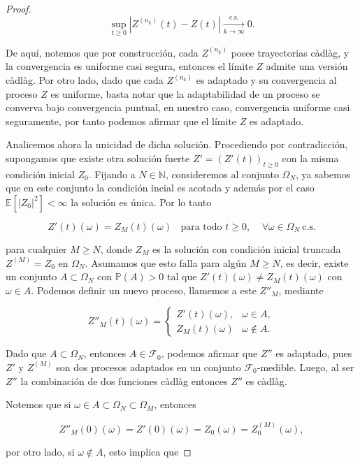 \documentclass[
  spanish,
  us-letterpaper,
]{scrreprt}
\theoremstyle{plain}
\theoremstyle{plain}
\theoremstyle{plain}
\theoremstyle{definition}
\theoremstyle{remark}
\begin{document}
\begin{proof}
\[
    \sup\limits_{t\geq 0}|Z^{(n_k)}(t)-Z(t)| \xrightarrow[k \to \infty]{\text{c.s.}} 0.
\]

De aquí, notemos que por construcción, cada \(Z^{(n_k)}\) posee
trayectorias càdlàg, y la convergencia es uniforme casi segura, entonces
el límite \(Z\) admite una versión càdlàg. Por otro lado, dado que cada
\(Z^{(n_k)}\) es adaptado y su convergencia al proceso \(Z\) es
uniforme, basta notar que la adaptabilidad de un proceso se converva
bajo convergencia puntual, en nuestro caso, convergencia uniforme casi
seguramente, por tanto podemos afirmar que el límite \(Z\) es adaptado.

Analicemos ahora la unicidad de dicha solución. Procediendo por
contradicción, supongamos que existe otra solución fuerte
\(Z'=(Z'(t))_{t\geq 0}\) con la misma condición inicial \(Z_0\). Fijando
a \(N\in \mathbb{N}\), consideremos al conjunto \(\Omega_N\), ya sabemos
que en este conjunto la condición incial es acotada y además por el caso
\(\mathbb{E}[|Z_0|^2]<\infty\) la solución es única. Por lo tanto

\[
    Z'(t)(\omega) = Z_M(t)(\omega)\ \ \ \  \text{para todo }t\geq 0,\ \ \ \ \ \forall\omega\in \Omega_N\ \text{c.s.}
\]

para cualquier \(M\geq N\), donde \(Z_M\) es la solución con condición
inicial truncada \(Z^{(M)}=Z_0\) en \(\Omega_N\). Asumamos que esto
falla para algún \(M\geq N\), es decir, existe un conjunto
\(A\subset \Omega_N\) con \(\mathbb{P}(A)>0\) tal que
\(Z'(t)(\omega)\neq Z_M(t)(\omega)\) con \(\omega\in A.\) Podemos
definir un nuevo proceso, llamemos a este \(Z''_M\), mediante

\[
Z''_M(t)(\omega) =
\begin{cases}
Z'(t)(\omega), & \omega\in A, \\
Z_M(t)(\omega) & \omega\notin A.
\end{cases}    
\]

Dado que \(A\subset \Omega_N\), entonces \(A\in \mathcal{F}_0\), podemos
afirmar que \(Z''\) es adaptado, pues \(Z'\) y \(Z^{(M)}\) son dos
procesos adaptados en un conjunto \(\mathcal{F}_0\)-medible. Luego, al
ser \(Z''\) la combinación de dos funciones càdlàg entonces \(Z''\) es
càdlàg.

Notemos que si \(\omega\in A\subset \Omega_N\subset \Omega_M\), entonces

\[
    Z''_M(0)(\omega)=Z'(0)(\omega)=Z_0(\omega)=Z_0^{(M)}(\omega),
\]

por otro lado, si \(\omega\notin A\), esto implica que


\end{proof}
\end{document}

